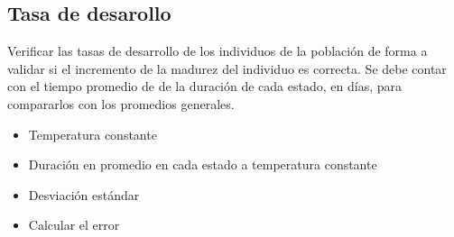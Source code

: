 \subsection{Tasa de desarollo}
Verificar las tasas de desarrollo de los individuos de la población de forma a validar
si el incremento de la madurez del individuo es correcta. Se debe contar con el tiempo
promedio de de la duración de cada estado, en días, para compararlos con los promedios
generales.

\begin{itemize}
    \item Temperatura constante
    \item Duración en promedio en cada estado a temperatura constante
    \item Desviación estándar
    \item Calcular el error
\end{itemize}
